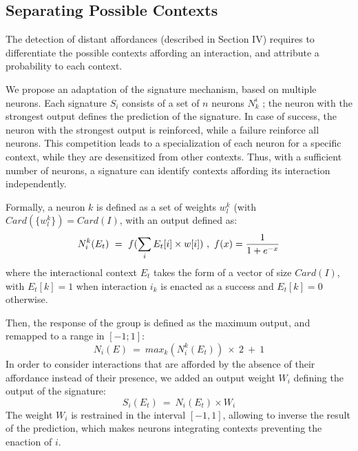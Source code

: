 \documentclass[conference]{IEEEtran}
\begin{document}


\subsection{Separating Possible Contexts}

The detection of distant affordances (described in Section IV) requires to differentiate the possible contexts affording an interaction, and attribute a probability to each context.

We propose an adaptation of the signature mechanism, based on multiple neurons. Each signature $S_i$ consists of a set of $n$ neurons $N_k^i$ ; the neuron with the strongest output defines the prediction of the signature. In case of success, the neuron with the strongest output is reinforced, while a failure reinforce all neurons. This competition leads to a specialization of each neuron for a specific context, while they are desensitized from other contexts. Thus, with a sufficient number of neurons, a signature can identify contexts affording its interaction independently.

Formally, a neuron $k$ is defined as a set of weights $w_l^k$ (with $Card(\{w_l^k\})=Card(I)$, with an output defined as:
\begin{equation}
N_i^k(E_t)~=~f(\sum_{i} E_t[i] \times w[i])~,~ f(x) = { {1}\over{1+e^{-x} }}
\end{equation}
where the interactional context $E_t$ takes the form of a vector of size $Card(I)$, with $E_t[k]=1$ when interaction $i_k$ is enacted as a success and $E_t[k]=0$ otherwise.

Then, the response of the group is defined as the maximum output, and remapped to a range in $[-1;1]$:
\begin{equation}
N_i(E)~=~max_k (N_i^k(E_t) ) \: \times \: 2 ~+~ 1
\end{equation}
In order to consider interactions that are afforded by the absence of their affordance instead of their presence, we added an output weight $W_i$ defining the output of the signature:
\begin{equation}
S_i(E_t)~=~N_i(E_t) \times W_i
\end{equation}
The weight $W_i$ is restrained in the interval $[-1,1]$, allowing to inverse the result of the prediction, which makes neurons integrating contexts preventing the enaction of $i$.
\end{document}
